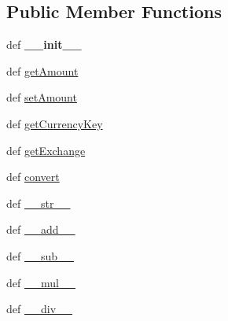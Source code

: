 \subsection*{Public Member Functions}
\begin{DoxyCompactItemize}
\item 
\hypertarget{class_solar_calculator_1_1_utils_1_1_py_exchange_rates_1_1_money_a9db754533e067baebaa15d03cab9427f}{def {\bfseries \-\_\-\-\_\-init\-\_\-\-\_\-}}\label{class_solar_calculator_1_1_utils_1_1_py_exchange_rates_1_1_money_a9db754533e067baebaa15d03cab9427f}

\item 
def \hyperlink{class_solar_calculator_1_1_utils_1_1_py_exchange_rates_1_1_money_a059526386d2f9ea260e7ea07102572ca}{get\-Amount}
\item 
def \hyperlink{class_solar_calculator_1_1_utils_1_1_py_exchange_rates_1_1_money_ac53d5f0031b71a00e88a768df7d6ed6a}{set\-Amount}
\item 
def \hyperlink{class_solar_calculator_1_1_utils_1_1_py_exchange_rates_1_1_money_aae1ead4291dde568973c5f738cfcfdac}{get\-Currency\-Key}
\item 
def \hyperlink{class_solar_calculator_1_1_utils_1_1_py_exchange_rates_1_1_money_aef3546d3a60403fddf731edf46e57c88}{get\-Exchange}
\item 
def \hyperlink{class_solar_calculator_1_1_utils_1_1_py_exchange_rates_1_1_money_a34b18850a89d264aae42218e22429624}{convert}
\item 
def \hyperlink{class_solar_calculator_1_1_utils_1_1_py_exchange_rates_1_1_money_aa73e41400fb5aa636cf362ff64e0b2c0}{\-\_\-\-\_\-str\-\_\-\-\_\-}
\item 
def \hyperlink{class_solar_calculator_1_1_utils_1_1_py_exchange_rates_1_1_money_af863a20baf44644fd5ae7cdb9f179876}{\-\_\-\-\_\-add\-\_\-\-\_\-}
\item 
def \hyperlink{class_solar_calculator_1_1_utils_1_1_py_exchange_rates_1_1_money_a1379da50fb8fadb3be60034d65975eb2}{\-\_\-\-\_\-sub\-\_\-\-\_\-}
\item 
def \hyperlink{class_solar_calculator_1_1_utils_1_1_py_exchange_rates_1_1_money_ac369c300dd02389cf775dd876843b4d2}{\-\_\-\-\_\-mul\-\_\-\-\_\-}
\item 
def \hyperlink{class_solar_calculator_1_1_utils_1_1_py_exchange_rates_1_1_money_ac775d6d79cabb17949e64d2661071dea}{\-\_\-\-\_\-div\-\_\-\-\_\-}
\end{DoxyCompactItemize}
